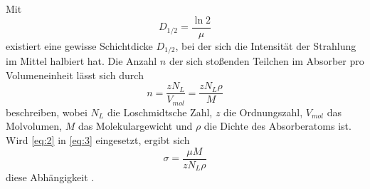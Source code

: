 Mit 
\begin{equation*}
  D_{1/2}=\frac{\ln{2}}{\mu}
\end{equation*}
existiert eine gewisse Schichtdicke $D_{1/2}$, bei der sich die Intensität der Strahlung im Mittel halbiert hat. Die Anzahl $n$ der sich stoßenden Teilchen im Absorber pro Volumeneinheit lässt sich durch
\begin{equation}
  n= \frac{z N_{L}}{V_{mol}}= \frac{z N_{L} \rho}{M}
  \label{eq:3}
\end{equation}
beschreiben, wobei $N_{L}$ die Loschmidtsche Zahl, $z$ die Ordnungszahl, $V_{mol}$ das Molvolumen, $M$ das Molekulargewicht und $\rho$ die Dichte des Absorberatoms ist. Wird \eqref{eq:2} in \eqref{eq:3} eingesetzt, ergibt sich 
\begin{equation}
  \sigma=\frac{\mu M}{z N_{L}\rho}
  \label{eq:4}
\end{equation}
diese Abhängigkeit \cite{sample}.

